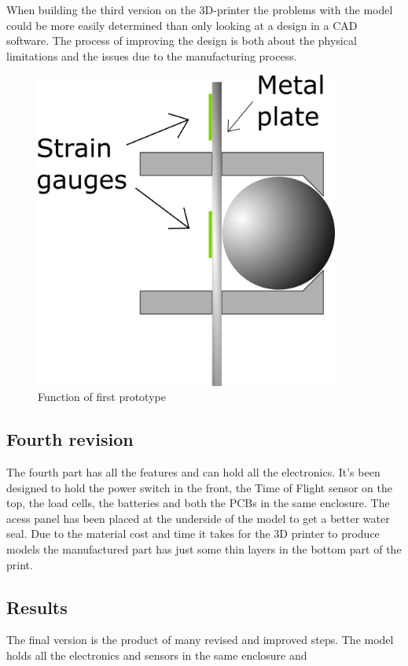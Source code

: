 When building the third version on the 3D-printer the problems with the model could be more easily determined than only looking at a design in a CAD software. The process of improving the design is both about the physical limitations and the issues  due to the manufacturing process. 

\begin{figure}[H]
\begin{center}
	\includegraphics[width = 10cm]{Figures/Press_sens_func_1.png}
	\caption{Function of first prototype}
	\label{Press_sens_prot_1}
\end{center}
\end{figure}

\subsection{Fourth revision}

The fourth part has all the features and can hold all the electronics. It's been designed to hold the power switch in the front, the Time of Flight sensor on the top, the load cells, the batteries and both the PCBs in the same enclosure. The acess panel has been placed at the underside of the model to get a better water seal.
Due to the material cost and time it takes for the 3D printer to produce models the manufactured part has just some thin layers in the bottom part of the print.  

\subsection{Results}
The final version is the product of many revised and improved steps. The model holds all the electronics and sensors in the same enclosure and  

